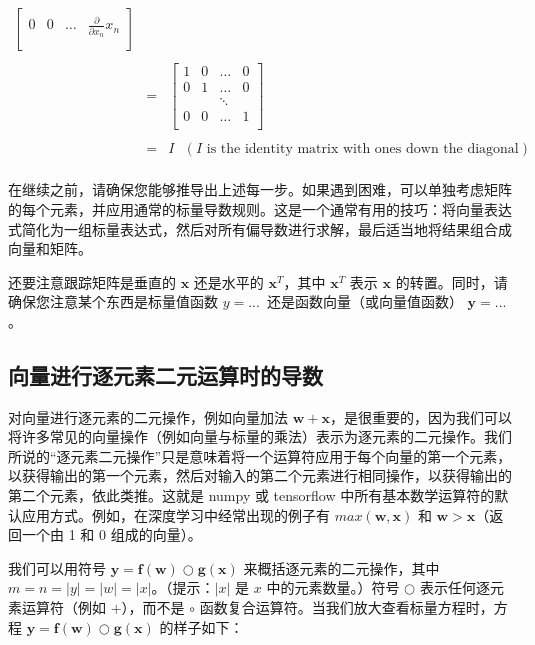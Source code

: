 \documentclass{ctexart}
\begin{document}
\begin{center}
\begin{eqnarray*}
\begin{bmatrix}
	0 & 0 &\ldots& \frac{\partial}{\partial {x_n}} x_n \\
	\end{bmatrix}\\\\
	 & = & \begin{bmatrix}
	1 & 0 & \ldots& 0 \\
	0 &1 &\ldots & 0 \\
	& & \ddots\\
	0 & 0 & \ldots &1 \\
	\end{bmatrix}\\\\
	& = & I ~~~(I \text{ is the identity matrix with ones down the diagonal})\\
	\end{eqnarray*}

\end{center}

在继续之前，请确保您能够推导出上述每一步。如果遇到困难，可以单独考虑矩阵的每个元素，并应用通常的标量导数规则。这是一个通常有用的技巧：将向量表达式简化为一组标量表达式，然后对所有偏导数进行求解，最后适当地将结果组合成向量和矩阵。

还要注意跟踪矩阵是垂直的 $\mathbf{x}$ 还是水平的 $\mathbf{x}^T$，其中 $\mathbf{x}^T$ 表示 $\mathbf{x}$ 的转置。同时，请确保您注意某个东西是标量值函数 $y = ...\,$ 还是函数向量（或向量值函数） $\mathbf{y} = ...\,$。

\subsection{向量进行逐元素二元运算时的导数}

对向量进行逐元素的二元操作，例如向量加法 $\mathbf{w} + \mathbf{x}$，是很重要的，因为我们可以将许多常见的向量操作（例如向量与标量的乘法）表示为逐元素的二元操作。我们所说的“逐元素二元操作”只是意味着将一个运算符应用于每个向量的第一个元素，以获得输出的第一个元素，然后对输入的第二个元素进行相同操作，以获得输出的第二个元素，依此类推。这就是 numpy 或 tensorflow 中所有基本数学运算符的默认应用方式。例如，在深度学习中经常出现的例子有 $max(\mathbf{w},\mathbf{x})$ 和 $\mathbf{w} > \mathbf{x}$（返回一个由 1 和 0 组成的向量）。

我们可以用符号 $\mathbf{y} = \mathbf{f(w)} \bigcirc \mathbf{g(x)}$ 来概括逐元素的二元操作，其中 $m=n=|y|=|w|=|x|$。（提示：$|x|$ 是 $x$ 中的元素数量。）符号 $\bigcirc$ 表示任何逐元素运算符（例如 $+$），而不是 $\circ$ 函数复合运算符。当我们放大查看标量方程时，方程 $\mathbf{y} = \mathbf{f(w)} \bigcirc \mathbf{g(x)}$ 的样子如下：
\end{document}
